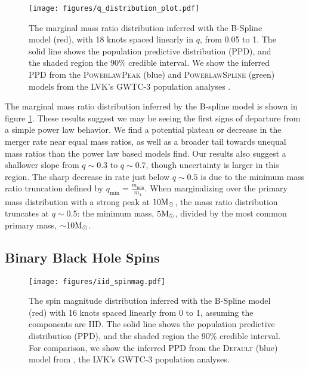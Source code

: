 \begin{figure}[h]
    \texttt{[image: figures/q\_distribution\_plot.pdf]}
    \caption{The marginal mass ratio distribution inferred with the B-Spline model (red), with 18 knots spaced linearly in $q$, from 0.05 to 1. The solid line shows the population predictive distribution (PPD), and the shaded region the 90\% credible interval. 
    We show the inferred PPD from the \textsc{PowerlawPeak} (blue) and \textsc{PowerlawSpline} (green) models from the LVK's GWTC-3 population analyses \citep{o3b_astro_dist}.}
    \label{fig:q_distribution}
\end{figure}

The marginal mass ratio distribution inferred by the B-spline model is shown in figure \ref{fig:q_distribution}.  These results suggest we may be seeing the first signs of departure from a simple power law behavior.  We find a potential plateau or decrease in the merger rate near equal mass ratios, as well as a broader tail towards unequal mass ratios 
than the power law based models find. Our results also suggest a shallower slope from $q\sim0.3$ to $q\sim0.7$, though uncertainty is larger in this region. The sharp decrease in rate just below 
$q\sim0.5$ is due to the minimum mass ratio truncation defined by $q_\mathrm{min}=\frac{m_\mathrm{min}}{m_1}$. When marginalizing over the primary mass 
distribution with a strong peak at $10{\rm M}_\odot$, the mass ratio distribution truncates at $q\sim0.5$: the minimum mass, $5{\rm M}_\odot$, 
divided by the most common primary mass, ${\sim}10{\rm M}_\odot$. 


\subsection{Binary Black Hole Spins} \label{sec:spin_dist}

\begin{figure}
    \begin{centering}    
        \texttt{[image: figures/iid\_spinmag.pdf]}
        \caption{The spin magnitude distribution inferred with the B-Spline model (red) with 16 knots spaced linearly from 0 to 1, assuming the components are IID. The solid line shows the population predictive distribution (PPD), and the shaded region the 90\% credible interval. 
        For comparison, we show the inferred PPD from the \textsc{Default} (blue) model from \citet{o3b_astro_dist}, the LVK's GWTC-3 population analyses.}
        \label{fig:iid_spinmag_dist}
    \end{centering}
\end{figure}

